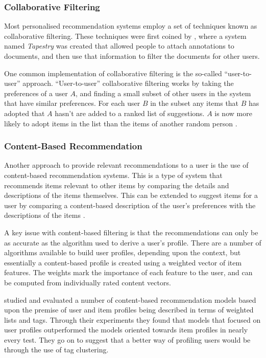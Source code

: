 \documentclass[12pt,a4paper]{article}
\begin{document}
\subsubsection{Collaborative Filtering}
Most personalised recommendation systems employ a set of techniques known as collaborative filtering. These techniques were first coined by \textcite{Goldberg:1992}, where a system named \emph{Tapestry} was created that allowed people to attach annotations to documents, and then use that information to filter the documents for other users.

One common implementation of collaborative filtering is the so-called ``user-to-user'' approach. ``User-to-user'' collaborative filtering works by taking the preferences of a user $A$, and finding a small subset of other users in the system that have similar preferences. For each user $B$ in the subset any items that $B$ has adopted that $A$ hasn't are added to a ranked list of suggestions. $A$ is now more likely to adopt items in the list than the items of another random person \parencite{Schafer:2001}.

\subsubsection{Content-Based Recommendation}
Another approach to provide relevant recommendations to a user is the use of content-based recommendation systems. This is a type of system that recommends items relevant to other items by comparing the details and descriptions of the items themselves. This can be extended to suggest items for a user by comparing a content-based description of the user's preferences with the descriptions of the items \parencite{Pazzani:2007}.

A key issue with content-based filtering is that the recommendations can only be as accurate as the algorithm used to derive a user's profile. There are a number of algorithms available to build user profiles, depending upon the context, but essentially a content-based profile is created using a weighted vector of item features. The weights mark the importance of each feature to the user, and can be computed from individually rated content vectors.

\textcite{Cantador:2010} studied and evaluated a number of content-based recommendation models based upon the premise of user and item profiles being described in terms of weighted lists and tags. Through their experiments they found that models that focused on user profiles outperformed the models oriented towards item profiles in nearly every test. They go on to suggest that a better way of profiling users would be through the use of tag clustering.
\end{document}
